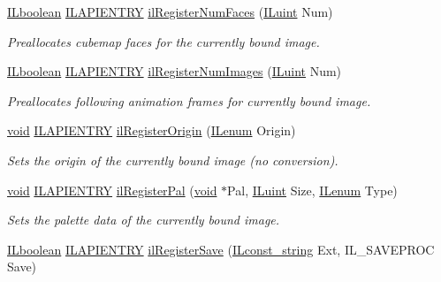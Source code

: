 \begin{DoxyCompactItemize}
\hyperlink{group__il__types_gaa6aa7c95cfdc06b4d8601ef832b7bb0a}{I\+Lboolean} \hyperlink{_i_l_8h_a69c08a8d06df986f7e46f209d131ef2f}{I\+L\+A\+P\+I\+E\+N\+T\+R\+Y} \hyperlink{group__register_ga309eed368a7585dfaa12ed096d2fcef5}{il\+Register\+Num\+Faces} (\hyperlink{group__il__types_gaff8e86a1072c8d7cfe387fb87c6ed8e1}{I\+Luint} Num)
\begin{DoxyCompactList}\small\item\em Preallocates cubemap faces for the currently bound image. \end{DoxyCompactList}\item 
\hyperlink{group__il__types_gaa6aa7c95cfdc06b4d8601ef832b7bb0a}{I\+Lboolean} \hyperlink{_i_l_8h_a69c08a8d06df986f7e46f209d131ef2f}{I\+L\+A\+P\+I\+E\+N\+T\+R\+Y} \hyperlink{group__register_ga0b3448c79f53f70b5716bab4b82a45cb}{il\+Register\+Num\+Images} (\hyperlink{group__il__types_gaff8e86a1072c8d7cfe387fb87c6ed8e1}{I\+Luint} Num)
\begin{DoxyCompactList}\small\item\em Preallocates following animation frames for currently bound image. \end{DoxyCompactList}\item 
\hyperlink{_i_l_8h_a5530e04d947bcddd83639ea7940faf10}{void} \hyperlink{_i_l_8h_a69c08a8d06df986f7e46f209d131ef2f}{I\+L\+A\+P\+I\+E\+N\+T\+R\+Y} \hyperlink{group__register_ga79cd7bac1b68d6e78fa585fb57754b97}{il\+Register\+Origin} (\hyperlink{group__il__types_ga62ca73445716183ef42b1f3906a45ed0}{I\+Lenum} Origin)
\begin{DoxyCompactList}\small\item\em Sets the origin of the currently bound image (no conversion). \end{DoxyCompactList}\item 
\hyperlink{_i_l_8h_a5530e04d947bcddd83639ea7940faf10}{void} \hyperlink{_i_l_8h_a69c08a8d06df986f7e46f209d131ef2f}{I\+L\+A\+P\+I\+E\+N\+T\+R\+Y} \hyperlink{group__register_ga66dfc863bb20e62978f3fe613a8de007}{il\+Register\+Pal} (\hyperlink{_i_l_8h_a5530e04d947bcddd83639ea7940faf10}{void} $\ast$Pal, \hyperlink{group__il__types_gaff8e86a1072c8d7cfe387fb87c6ed8e1}{I\+Luint} Size, \hyperlink{group__il__types_ga62ca73445716183ef42b1f3906a45ed0}{I\+Lenum} Type)
\begin{DoxyCompactList}\small\item\em Sets the palette data of the currently bound image. \end{DoxyCompactList}\item 
\hyperlink{group__il__types_gaa6aa7c95cfdc06b4d8601ef832b7bb0a}{I\+Lboolean} \hyperlink{_i_l_8h_a69c08a8d06df986f7e46f209d131ef2f}{I\+L\+A\+P\+I\+E\+N\+T\+R\+Y} \hyperlink{group__register_ga9e630bbaa6a19e4f0a2438bd552ee563}{il\+Register\+Save} (\hyperlink{group__il__types_ga1aa1edc3eb344e14acacb02bade24a5a}{I\+Lconst\+\_\+string} Ext, I\+L\+\_\+\+S\+A\+V\+E\+P\+R\+O\+C Save)

\end{DoxyCompactItemize}
